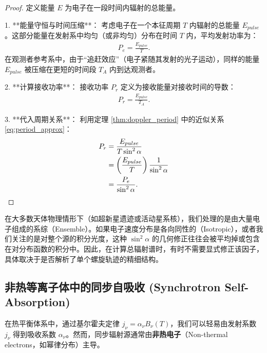 \begin{proof}
定义能量 $E$ 为电子在一段时间内辐射的总能量。

1. **能量守恒与时间压缩**：
   考虑电子在一个本征周期 $T$ 内辐射的总能量 $E_{pulse}$。这部分能量在发射系中均匀（或非均匀）分布在时间 $T$ 内，平均发射功率为：
   \begin{align}
       P_{e} = \frac{E_{pulse}}{T}.
   \end{align}
   在观测者参考系中，由于“追赶效应”（电子紧随其发射的光子运动），同样的能量 $E_{pulse}$ 被压缩在更短的时间段 $T_{A}$ 内到达观测者。

2. **计算接收功率**：
   接收功率 $P_{r}$ 定义为接收能量对接收时间的导数：
   \begin{align}
       P_{r} = \frac{E_{pulse}}{T_{A}}.
   \end{align}

3. **代入周期关系**：
   利用定理 \ref{thm:doppler_period} 中的近似关系 \eqref{eq:period_approx}：
   \begin{align}
       P_{r} &= \frac{E_{pulse}}{T \sin^2\alpha} \notag \\
             &= \left( \frac{E_{pulse}}{T} \right) \frac{1}{\sin^2\alpha} \notag \\
             &= \frac{P_{e}}{\sin^2\alpha}.
   \end{align}
\end{proof}

\begin{example}[天体物理中的应用]
在大多数天体物理情形下（如超新星遗迹或活动星系核），我们处理的是由大量电子组成的系综（Ensemble）。如果电子速度分布是各向同性的（Isotropic），或者我们关注的是对整个源的积分光度，这种 $\sin^2\alpha$ 的几何修正往往会被平均掉或包含在对分布函数的积分中。因此，在计算总辐射谱时，有时不需要显式修正该因子，具体取决于是否解析了单个螺旋轨迹的精细结构。
\end{example}

\subsection{非热等离子体中的同步自吸收 (Synchrotron Self-Absorption)}

\begin{derivationnote}
    在热平衡体系中，通过基尔霍夫定律 $j_{\nu} = \alpha_{\nu} B_{\nu}(T)$，我们可以轻易由发射系数 $j_{\nu}$ 得到吸收系数 $\alpha_{\nu}$。然而，同步辐射源通常由\textbf{非热电子}（Non-thermal electrons，如幂律分布）主导。
\end{derivationnote}

